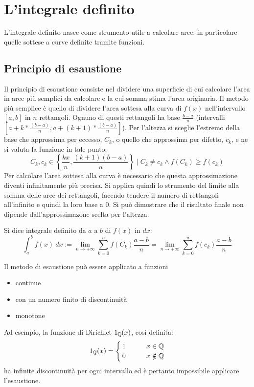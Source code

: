 \section{L'integrale definito}
L'integrale definito nasce come strumento utile a calcolare aree: in particolare quelle sottese a curve definite tramite funzioni.

\subsection{Principio di esaustione}
Il principio di esaustione consiste nel dividere una superficie di cui calcolare l'area in aree più semplici da calcolare e la cui somma stima l'area originaria. Il metodo più semplice è quello di dividere l'area sottesa alla curva di $f(x)$ nell'intervallo $[a,b]$ in $n$ rettangoli. Ognuno di questi rettangoli ha base $\frac{b-a}{n}$ (intervalli $\left[a+k*\frac{(b-a)}{n}, a+(k+1)*\frac{(b-a)}{n}\right]$). Per l'altezza si sceglie l'estremo della base che approssima per eccesso, $C_k$, o quello che approssima per difetto, $c_k$, e ne si valuta la funzione in tale punto:
\[
	C_k,c_k\in\left\{\frac{kx}{n}, \frac{(k+1)(b-a)}{n}\right\}\mid C_k\neq c_k \land f(C_k)\geq f(c_k)
\]
Per calcolare l'area sottesa alla curva è necessario che questa approssimazione diventi infinitamente più precisa. Si applica quindi lo strumento del limite alla somma delle aree dei rettangoli, facendo tendere il numero di rettangoli all'infinito e quindi la loro base a $0$. Si può dimostrare che il risultato finale non dipende dall'approssimazone scelta per l'altezza.
\begin{defin}
	Si dice integrale definito da $a$ a $b$ di $f(x)$ in $dx$:
	\[
		\int_a^b f(x)~dx:=\lim_{n\to+\infty}\sum_{k=0}^n f(C_k)\frac{a-b}{n}=\lim_{n\to+\infty}\sum_{k=0}^n f(c_k)\frac{a-b}{n}
	\]
\end{defin}
Il metodo di esaustione può essere applicato a funzioni
\begin{itemize}
	\item continue
	\item con un numero finito di discontinuità
	\item monotone
\end{itemize}
Ad esempio, la funzione di Dirichlet $1_{\mathbb{Q}}(x)$, così definita:
\[
	1_{\mathbb{Q}}(x)=
	\begin{cases}
		1\qquad & x\in\mathbb{Q}    \\
		0\qquad & x\notin\mathbb{Q}
	\end{cases}
\]
ha infinite discontinuità per ogni intervallo ed è pertanto impossibile applicare l'esaustione.

